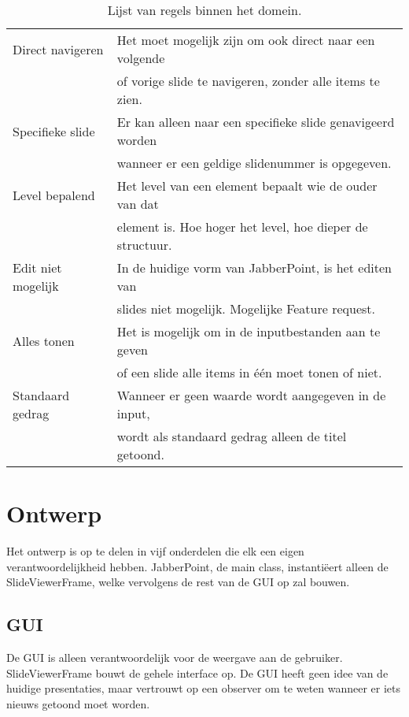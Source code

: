 \documentclass[a4paper]{article}
\newcommand{\1}[0]{\'{e}\'{e}n}
\begin{document}
\begin{table}[!h]
\begin{tabular}{ll}
 	Direct navigeren & Het moet mogelijk zijn om ook direct naar een volgende \\& of vorige slide te navigeren, zonder alle items te zien.\\
 	Specifieke slide & Er kan alleen naar een specifieke slide genavigeerd worden \\& wanneer er een geldige slidenummer is opgegeven.\\
 	Level bepalend & Het level van een element bepaalt wie de ouder van dat \\& element is. Hoe hoger het level, hoe dieper de structuur.\\
 	Edit niet mogelijk & In de huidige vorm van JabberPoint, is het editen van \\& slides niet mogelijk. Mogelijke Feature request.\\
 	Alles tonen & Het is mogelijk om in de inputbestanden aan te geven \\& of een slide alle items in \1 moet tonen of niet.\\
 	Standaard gedrag & Wanneer er geen waarde wordt aangegeven in de input, \\& wordt als standaard gedrag alleen de titel getoond.\\
  	\bottomrule
	\end{tabular}
\caption{Lijst van regels binnen het domein.}
\label{table:regels}
\end{table}

\section{Ontwerp}
\label{sec:ontwerp}
Het ontwerp is op te delen in vijf onderdelen die elk een eigen
verantwoordelijkheid hebben. JabberPoint, de main class, instanti\"{e}ert alleen de
SlideViewerFrame, welke vervolgens de rest van de GUI op zal bouwen.

\subsection{GUI}
De GUI is alleen verantwoordelijk voor de weergave aan de gebruiker.
SlideViewerFrame bouwt de gehele interface op. De GUI heeft geen idee van de
huidige presentaties, maar vertrouwt op een observer om te weten wanneer er iets
nieuws getoond moet worden.
\end{document}
